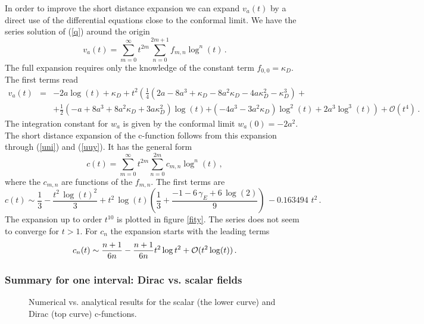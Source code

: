 \documentclass[a4paper]{article}
\begin{document}
In order to improve the short distance expansion we can expand $v_{a }(t)$ by
a direct use of the differential equations close to the conformal limit. We have the series
solution of (\ref{q}) around the origin
\begin{equation}
v_{a }(t)=\sum_{m=0}^{\infty }t^{2m}\sum_{n=0}^{2m+1}f_{m,n}\log
^{n}(t)\,.
\end{equation}
The full expansion requires only the knowledge of the constant term $
f_{0,0}=\kappa_D$. The first terms read
\begin{eqnarray}
v_{a }(t) &=&-2 a \log (t)+\kappa_D+t^{2}\left( \frac{1}{4}\left( 2 a
-8 a ^{3}+\kappa_D-8 a ^{2}\kappa_D-4 a \kappa_D^{2}-\kappa_D^{3}\right) +\right.   
\\
&&+\frac{1}{2}\left( - a +8 a ^{3}+8 a ^{2}\kappa_D+3 a
\kappa_D^{2}\right) \log (t) \left. +\left( -4 a ^{3}-3 a ^{2}\kappa_D\right) \log
^{2}(t)+2 a ^{3}\log ^{3}(t)\right) +\mathcal{O}(t^{4}) \,.\nonumber 
\end{eqnarray}
 The integration constant for $
w_{a }$ is given by the conformal limit $w_{a
}(0)=-2 a ^{2}$. The short distance expansion of the c-function follows from this expansion through (\ref{uni}) and (\ref{uuy}). It has the general form 
\begin{equation}
c(t)=  \sum_{m=0}^{\infty }t^{2m}\sum_{n=0}^{2m}c_{m,n}\log
^{n}(t)\,,
\end{equation}
where the $c_{m,n}$ are functions of the $f_{m,n}$.
The first terms are
\begin{equation}
c(t)\sim\frac{1}{3}- \frac{t^2\,{\log (t)}^2}{3}+ t^2\,\log (t)\left( \frac{1}{3} +\frac{-1 - 6\,\gamma_E + 6\,\log (2)}{9} \right) \, - 0.163494\, \,t^2 \,.\label{expi}
\end{equation}
  The expansion up to order $t^{10}$ is plotted in figure \ref{fity}. The series does not seem to converge for $t>1$. For $c_n$ the expansion starts with the leading terms
  \begin{equation}
 c_n(t)\sim \frac{n+1}{6n}-\frac{n+1}{6n}t^2 \log t^2+{\cal O}(t^2 \log(t))\,.
\end{equation}



\subsubsection{Summary for one interval: Dirac vs. scalar fields}

\begin{figure} [tb]
\centering
\leavevmode
\epsfysize=5cm
\bigskip
{}
\caption{Numerical vs. analytical results for the scalar (the lower curve) and Dirac (top curve) c-functions.}
\label{pietro}
\end{figure}
\end{document}
